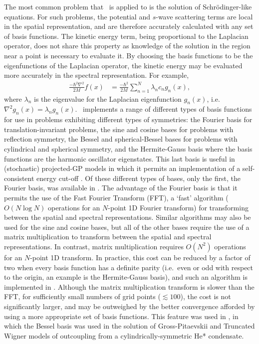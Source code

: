 The most common problem that \xpdeint\ is applied to is the solution of Schrödinger-like equations.  For such problems, the potential and $s$-wave scattering terms are local in the spatial representation, and are therefore accurately calculated with any set of basis functions.  The kinetic energy term, being proportional to the Laplacian operator, does not share this property as knowledge of the solution in the region near a point is necessary to evaluate it.  By choosing the basis functions to be the eigenfunctions of the Laplacian operator, the kinetic energy may be evaluated more accurately in the spectral representation.  For example,
\begin{align}
    \frac{- \hbar^2 \nabla^2}{2 M} f(x) &= \frac{-\hbar^2}{2 M}\sum_{n=1}^{N} \lambda_n c_n g_n(x),
\end{align}
where $\lambda_n$ is the eigenvalue for the Laplacian eigenfunction $g_n(x)$, i.e.\ $\nabla^2 g_n(x) = \lambda_n g_n(x)$.  \xpdeint\ implements a range of different types of basis functions for use in problems exhibiting different types of symmetries: the Fourier basis for translation-invariant problems, the sine and cosine bases for problems with reflection symmetry, the Bessel and spherical-Bessel bases for problems with cylindrical and spherical symmetry, and the Hermite-Gauss basis where the basis functions are the harmonic oscillator eigenstates.  This last basis is useful in (stochastic) projected-GP models in which it permits an implementation of a self-consistent energy cut-off \citep{Blakie:2008a}.  Of these different types of bases, only the first, the Fourier basis, was available in \XMDS.  The advantage of the Fourier basis is that it permits the use of the Fast Fourier Transform (FFT), a `fast' algorithm ($O(N \log N)$ operations for an $N$-point 1D Fourier transform) for transforming between the spatial and spectral representations.  Similar algorithms may also be used for the sine and cosine bases, but all of the other bases require the use of a matrix multiplication to transform between the spatial and spectral representations.  In contrast, matrix multiplication requires $O(N^2)$ operations for an $N$-point 1D transform.  In practice, this cost can be reduced by a factor of two when every basis function has a definite parity (i.e.\ even or odd with respect to the origin, an example is the Hermite-Gauss basis), and such an algorithm is implemented in \xpdeint.  Although the matrix multiplication transform is slower than the FFT, for sufficiently small numbers of grid points ($\lesssim 100$), the cost is not significantly larger, and may be outweighed by the better convergence afforded by using a more appropriate set of basis functions.  This feature was used in , in which the Bessel basis was used in the solution of Gross-Pitaevskii and Truncated Wigner models of outcoupling from a cylindrically-symmetric He* condensate.

